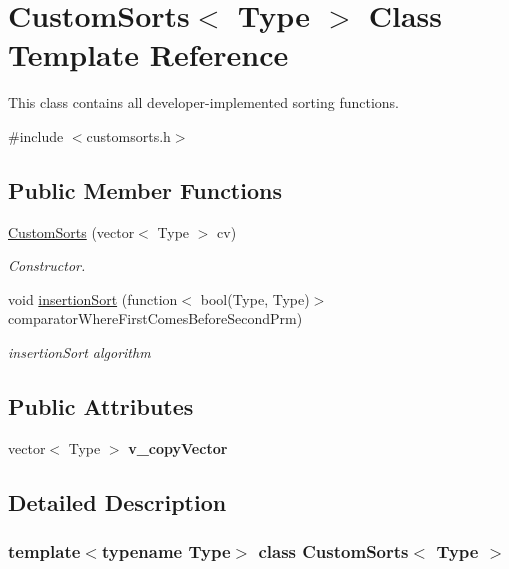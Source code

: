 \hypertarget{class_custom_sorts}{}\section{Custom\+Sorts$<$ Type $>$ Class Template Reference}
\label{class_custom_sorts}


This class contains all developer-\/implemented sorting functions.  




{\ttfamily \#include $<$customsorts.\+h$>$}

\subsection*{Public Member Functions}
\begin{DoxyCompactItemize}
\item 
\mbox{\hyperlink{class_custom_sorts_a6605d8169cb352d9f71577eb4fff6e8d}{Custom\+Sorts}} (vector$<$ Type $>$ cv)
\begin{DoxyCompactList}\small\item\em Constructor. \end{DoxyCompactList}\item 
void \mbox{\hyperlink{class_custom_sorts_af4fd734d9de0903b53fc53ef007d1aa6}{insertion\+Sort}} (function$<$ bool(Type, Type)$>$ comparator\+Where\+First\+Comes\+Before\+Second\+Prm)
\begin{DoxyCompactList}\small\item\em insertion\+Sort algorithm \end{DoxyCompactList}\end{DoxyCompactItemize}
\subsection*{Public Attributes}
\begin{DoxyCompactItemize}
\item 
\mbox{\label{class_custom_sorts_a06f8a43acba29dbe9771bd8f277478ff}} 
vector$<$ Type $>$ {\bfseries v\+\_\+copy\+Vector}
\end{DoxyCompactItemize}


\subsection{Detailed Description}
\subsubsection*{template$<$typename Type$>$\newline
class Custom\+Sorts$<$ Type $>$}

